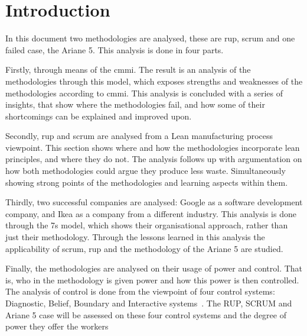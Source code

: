\chapter{Introduction}
In this document two methodologies are analysed, these are \ac{rup}, \ac{scrum} and one failed case, the Ariane 5. This analysis is done in four parts. 

Firstly, through means of the \ac{cmmi}. The result is an analysis of the methodologies through this model, which exposes strengths and weaknesses of the methodologies according to \ac{cmmi}. This analysis is concluded with a series of insights, that show where the methodologies fail, and how some of their shortcomings can be explained and improved upon. 

Secondly, \ac{rup} and \ac{scrum} are analysed from a Lean manufacturing process viewpoint. This section shows where and how the methodologies incorporate lean principles, and where they do not. The analysis follows up with argumentation on how both methodologies could argue they produce less waste. Simultaneously showing strong points of the methodologies and learning aspects within them.

Thirdly, two successful companies are analysed: Google as a software development company, and Ikea as a company from a different industry. This analysis is done through the \ac{7s} model, which shows their organisational approach, rather than just their methodology. Through the lessons learned in this analysis the applicability of \ac{scrum}, \ac{rup} and the methodology of the Ariane 5 are studied.

Finally, the methodologies are analysed on their usage of power and control. That is, who in the methodology is given power and how this power is then controlled. The analysis of control is done from the viewpoint of four control systems: Diagnostic, Belief, Boundary and Interactive systems~\citep{simons1995control}. The RUP, SCRUM and Ariane 5 case will be assessed on these four control systems and the degree of power they offer the workers 


